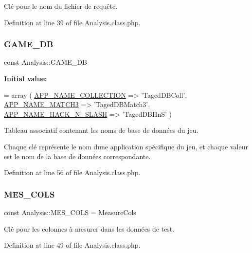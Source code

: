 Clé pour le nom du fichier de requête. 

Definition at line 39 of file Analysis.\+class.\+php.

\mbox{\label{class_analysis_ab3b63f8850456bd9000888c83182a296}} 
\subsubsection{\texorpdfstring{G\+A\+M\+E\+\_\+\+DB}{GAME\_DB}}
{\footnotesize\ttfamily const Analysis\+::\+G\+A\+M\+E\+\_\+\+DB}

{\bfseries Initial value\+:}
\begin{DoxyCode}
= array (
        \hyperlink{application_2src_2define_8php_a31f941544cc2bc0be58b14635dd94068}{APP\_NAME\_COLLECTION}   => \textcolor{stringliteral}{'TagedDBColl'},
        \hyperlink{application_2src_2define_8php_ab846d713e68b6f55576177371ac36563}{APP\_NAME\_MATCH3}       => \textcolor{stringliteral}{'TagedDBMatch3'},
        \hyperlink{application_2src_2define_8php_aafbb283144936400f27f3234053d0d8d}{APP\_NAME\_HACK\_N\_SLASH} => \textcolor{stringliteral}{'TagedDBHnS'}
    )
\end{DoxyCode}
Tableau associatif contenant les noms de base de données du jeu.

Chaque clé représente le nom d\textquotesingle{}une application spécifique du jeu, et chaque valeur est le nom de la base de données correspondante. 

Definition at line 56 of file Analysis.\+class.\+php.

\mbox{\label{class_analysis_a346bb11fddd93e2b0c7257dd838ead11}} 
\subsubsection{\texorpdfstring{M\+E\+S\+\_\+\+C\+O\+LS}{MES\_COLS}}
{\footnotesize\ttfamily const Analysis\+::\+M\+E\+S\+\_\+\+C\+O\+LS = \textquotesingle{}Measure\+Cols\textquotesingle{}}

Clé pour les colonnes à mesurer dans les données de test. 

Definition at line 49 of file Analysis.\+class.\+php.

